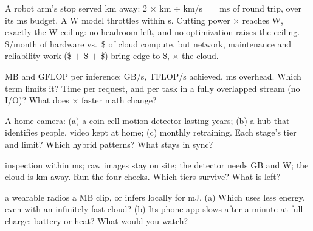 \documentclass{studysheet}
\begin{document}
\begin{rightcol}
%
  {A robot arm's stop served  km away: 2 $\times$  km $\div$  km/s $=$
    ms of round trip, over its  ms budget.}{}
%
  {A  W model throttles within  s. Cutting power $\times$ reaches  W,
   exactly the  W ceiling: no headroom left, and no optimization raises the ceiling.}{}
%
  {\$/month of hardware vs.\ \$ of cloud compute, but network, maintenance and reliability work
   (\$ $+$ \$ $+$ \$) bring edge to \$, $\times$ the cloud.}{}

\vspace{2pt}
\begin{qs}
\item \assumed{}  MB and  GFLOP per inference;  GB/s,  TFLOP/s achieved,
   ms overhead. Which term limits it? Time per request, and per task in a fully overlapped
  stream (no I/O)? What does $\times$ faster math change?
\item A home camera: (a) a coin-cell motion detector lasting years; (b) a hub that identifies people,
  video kept at home; (c) monthly retraining. Each stage's tier and limit? Which hybrid patterns? What
  stays in sync?
\item \assumed{} inspection within  ms; raw images stay on site; the detector needs  GB
  and  W; the cloud is  km away. Run the four checks. Which tiers survive? What is left?
\item \assumed{} a wearable radios a  MB clip, or infers locally for  mJ. (a) Which
  uses less energy, even with an infinitely fast cloud? (b) Its phone app slows after a minute at full
  charge: battery or heat? What would you watch?
\end{qs}
\end{rightcol}
\end{document}
